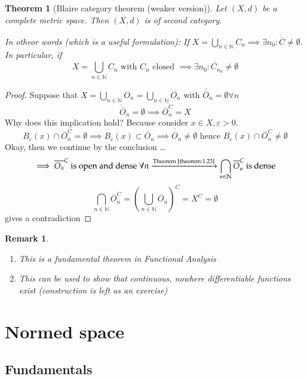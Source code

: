\documentclass{article}
\newcounter{lecref}[section]
\numberwithin{lecref}{section}
\newtheorem{theorem}[lecref]{Theorem}
\newtheorem*{Remark}{Remark}
\begin{document}
\begin{theorem}[Blaire category theorem (weaker version)]
	Let $(X, d)$ be a complete metric space. Then $(X, d)$ is of second category.

	In otheor words (which is a useful formulation):
	If $X = \bigcup_{n \in \mathbb N} C_n \implies \exists n_0: \mathring{\overline C} \neq \emptyset$.
	In particular, if
	\[ X = \bigcup_{n \in \mathbb N} C_n \text{ with } C_n \text{ closed } \implies \exists n_0: \mathring{C_{n_0}} \neq \emptyset \]
\end{theorem}

\begin{proof}
	Suppose that $X = \bigcup_{n \in \mathbb N} O_n = \bigcup_{n \in \mathbb N} \overline{O_n}$ with $\mathring{\overline O_n} = \emptyset \forall n$
	\[ \mathring{\overline O}_n = \emptyset \implies \overline{\overline{O}_n^C} = X \]
	Why does this implication hold? Because consider $x \in X, \varepsilon > 0$.
	\[ B_\varepsilon(x) \cap \overline O_n^C = \emptyset \implies B_{\varepsilon}(x) \subset \overline{O}_n \implies \mathring{\overline O_n} \neq \emptyset \text{ hence } B_\varepsilon(x) \cap {\overline O}_n^C \neq \emptyset \]
	Okay, then we continue by the conclusion \dots
	\[ \implies \overline{O_n}^C \text{ is open and dense } \forall n \xrightarrow{\text{Theorem~\ref{theorem:1.23}}} \bigcap_{n \in \mathbb N} \overline{O}_n^C \text{ is dense} \]
	\[ \bigcap_{n \in \mathbb N} \overline{O}_n^C = \left(\bigcup_{n \in \mathbb N} \overline{O}_n\right)^C = X^C = \emptyset \]
	gives a contradiction
\end{proof}

\begin{Remark}
	\begin{enumerate}
		\item This is a fundamental theorem in Functional Analysis
		\item This can be used to show that continuous, nowhere differentiable functions exist (construction is left as an exercise)
	\end{enumerate}
\end{Remark}

\section{Normed space}
\label{section:2}
\subsection{Fundamentals}
\label{section:2.1}
\end{document}
